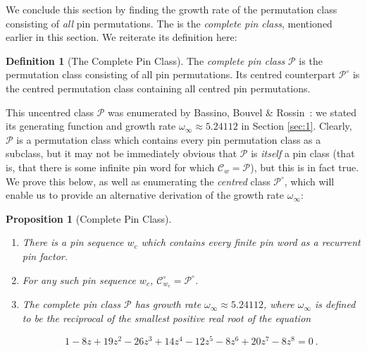 \documentclass[11pt,a4paper]{article}
\newtheorem{prop}[thm]{Proposition}
\theoremstyle{definition}
\newtheorem{defn}[thm]{Definition}
\begin{document}
We conclude this section by finding the growth rate of the permutation class consisting of \emph{all} pin permutations. The is the \emph{complete pin class}, mentioned earlier in this section. We reiterate its definition here:

\begin{defn}[The Complete Pin Class]
The \emph{complete pin class} $\mathcal{P}$ is the permutation class consisting of all pin permutations. Its centred counterpart $\mathcal{P}^{\circ}$ is the centred permutation class containing all centred pin permutations.
\end{defn}

This uncentred class $\mathcal{P}$ was enumerated by Bassino, Bouvel \& Rossin~\cite{bassino:enumeration-of-:}: we stated its generating function and growth rate $\omega_{\infty} \approx 5.24112$ in Section \ref{sec:1}. Clearly, $\mathcal{P}$ is a permutation class which contains every pin permutation class as a subclass, but it may not be immediately obvious that $\mathcal{P}$ is \emph{itself} a pin class (that is, that there is some infinite pin word for which $\mathcal{C}_{w} = \mathcal{P}$), but this is in fact true. We prove this below, as well as enumerating the \emph{centred} class $\mathcal{P}^{\circ}$, which will enable us to provide an alternative derivation of the growth rate $\omega_{\infty}$:

\begin{prop}[Complete Pin Class] \ \label{prop:comppinclassenum}
\begin{enumerate}
\item There is a pin sequence $w_{c}$ which contains every finite pin word as a recurrent pin factor.
\item For any such pin sequence $w_{c}$, $\mathcal{C}^{\circ}_{w_{c}} = \mathcal{P}^{\circ}$.
\item The complete pin class $\mathcal{P}$ has growth rate $\omega_{\infty} \approx 5.24112$, where $\omega_{\infty}$ is defined to be the reciprocal of the smallest positive real root of the equation

\[
1 - 8z + 19z^2 - 26z^3 + 14z^4 - 12z^5 - 8z^6 + 20z^7 - 8z^8 = 0 \ .
\]
\end{enumerate}
\end{prop}
\end{document}
